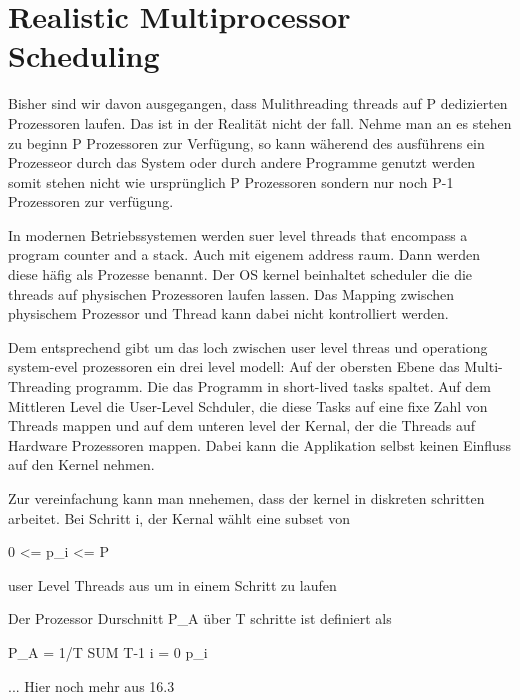 \section{Realistic Multiprocessor Scheduling}

Bisher sind wir davon ausgegangen, dass Mulithreading threads auf P dedizierten Prozessoren laufen. Das ist in der Realität nicht der fall. Nehme man an es stehen zu beginn P Prozessoren zur Verfügung, so kann wäherend des ausführens ein Prozesseor durch das System oder durch andere Programme genutzt werden somit stehen nicht wie ursprünglich P Prozessoren sondern nur noch P-1 Prozessoren zur verfügung.

In modernen Betriebssystemen werden suer level threads that encompass a program counter and a stack. Auch mit eigenem address raum. Dann werden diese häfig als Prozesse benannt. Der OS kernel beinhaltet scheduler die die threads auf physischen Prozessoren laufen lassen. Das Mapping zwischen physischem Prozessor und Thread kann dabei nicht kontrolliert werden.

Dem entsprechend gibt um das loch zwischen user level threas und operationg system-evel prozessoren ein drei level modell: Auf der obersten Ebene das Multi-Threading programm. Die das Programm in short-lived tasks spaltet. Auf dem Mittleren Level die User-Level Schduler, die diese Tasks auf eine fixe Zahl von Threads mappen und auf dem unteren level der Kernal, der die Threads auf Hardware Prozessoren  mappen. Dabei kann die Applikation selbst keinen Einfluss auf den Kernel nehmen. 

Zur vereinfachung kann man nnehemen, dass der kernel in diskreten schritten arbeitet. Bei Schritt i, der Kernal wählt eine subset von

0 <= p_i <= P

user Level Threads aus um in einem Schritt zu laufen

Der Prozessor Durschnitt P_A
über T schritte ist definiert als

P_A = 1/T SUM T-1 i = 0 p_i

... Hier noch mehr aus 16.3